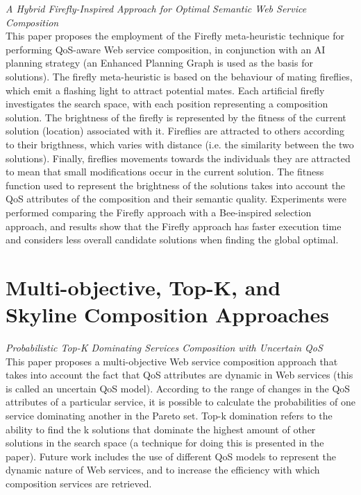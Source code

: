 \textit{A Hybrid Firefly-Inspired Approach for Optimal Semantic Web Service Composition \cite{pop2011hybrid}}\\
This paper proposes the employment of the Firefly meta-heuristic technique for performing QoS-aware Web service composition, in conjunction with an AI planning strategy (an Enhanced Planning Graph is used as the basis for solutions). The firefly meta-heuristic is based on the behaviour of mating fireflies, which emit a flashing light to attract potential mates. Each artificial firefly investigates the search space, with each position representing a composition solution. The brightness of the firefly is represented by the fitness of the current solution (location) associated with it. Fireflies are attracted to others according to their brigthness, which varies with distance (i.e. the similarity between the two solutions). Finally, fireflies movements towards the individuals they are attracted to mean that small modifications occur in the current solution. The fitness function used to represent the brightness of the solutions takes into account the QoS attributes of the composition and their semantic quality. Experiments were performed comparing the Firefly approach with a Bee-inspired selection approach, and results show that the Firefly approach has faster execution time and considers less overall candidate solutions when finding the global optimal.

\section{Multi-objective, Top-K, and Skyline Composition Approaches}
\textit{Probabilistic Top-K Dominating Services Composition with Uncertain QoS \cite{DBLP:journals/soca/WenTLCLH14}}\\
This paper proposes a multi-objective Web service composition approach that takes into account the fact that QoS attributes are dynamic
in Web services (this is called an uncertain QoS model). According to the range of changes in the QoS attributes of a particular service,
it is possible to calculate the probabilities of one service dominating another in the Pareto set. Top-k domination refers to the ability
to find the k solutions that dominate the highest amount of other solutions in the search space (a technique for doing this is presented
in the paper). Future work includes the use of different QoS models to represent the dynamic nature of Web services, and to increase the
efficiency with which composition services are retrieved.


